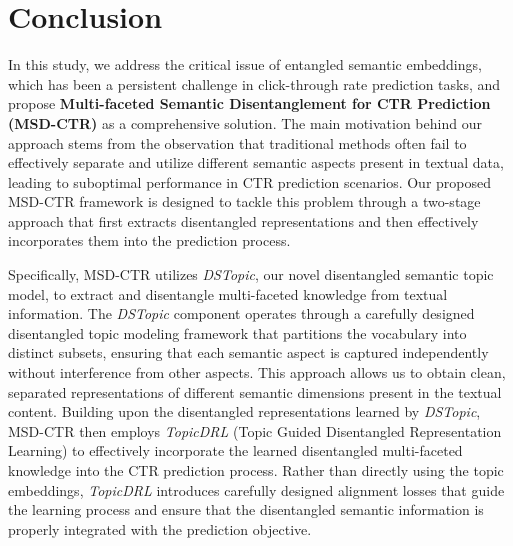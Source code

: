 \chapter{Conclusion}

In this study, we address the critical issue of entangled semantic embeddings, which has been a persistent challenge in click-through rate prediction tasks, and propose \textbf{Multi-faceted Semantic Disentanglement for CTR Prediction (MSD-CTR)} as a comprehensive solution. The main motivation behind our approach stems from the observation that traditional methods often fail to effectively separate and utilize different semantic aspects present in textual data, leading to suboptimal performance in CTR prediction scenarios. Our proposed MSD-CTR framework is designed to tackle this problem through a two-stage approach that first extracts disentangled representations and then effectively incorporates them into the prediction process.

Specifically, MSD-CTR utilizes \textit{DSTopic}, our novel disentangled semantic topic model, to extract and disentangle multi-faceted knowledge from textual information. The \textit{DSTopic} component operates through a carefully designed disentangled topic modeling framework that partitions the vocabulary into distinct subsets, ensuring that each semantic aspect is captured independently without interference from other aspects. This approach allows us to obtain clean, separated representations of different semantic dimensions present in the textual content. Building upon the disentangled representations learned by \textit{DSTopic}, MSD-CTR then employs \textit{TopicDRL} (Topic Guided Disentangled Representation Learning) to effectively incorporate the learned disentangled multi-faceted knowledge into the CTR prediction process. Rather than directly using the topic embeddings, \textit{TopicDRL} introduces carefully designed alignment losses that guide the learning process and ensure that the disentangled semantic information is properly integrated with the prediction objective.

